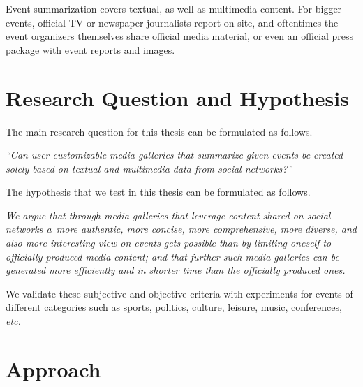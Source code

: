 Event summarization covers textual,
as well as multimedia content.
For bigger events, official TV or newspaper journalists
report on site, and oftentimes the event organizers themselves
share official media material,
or even an official press package with event reports and images.

\section{Research Question and Hypothesis}
The main research question for this thesis
can be formulated as follows.
 
\noindent \textit{``Can user-customizable
media galleries that summarize given events be
created solely based on textual and multimedia data
from social networks?''}

\noindent The hypothesis that we test in this thesis
can be formulated as follows.

\noindent \textit{We argue that
through media galleries that leverage content
shared on social networks
a~more \emph{authentic}, more \emph{concise},
more \emph{comprehensive}, more \emph{diverse},
and also more \emph{interesting}
view on events gets possible than by limiting oneself
to officially produced media content;
and that further such media galleries can be generated
more \emph{efficiently} and \emph{in shorter time}
than the officially produced ones.}

\noindent We validate these subjective and objective
criteria with experiments for events of different categories
such as sports, politics, culture, leisure,
music, conferences, \emph{etc.}

\section{Approach}

